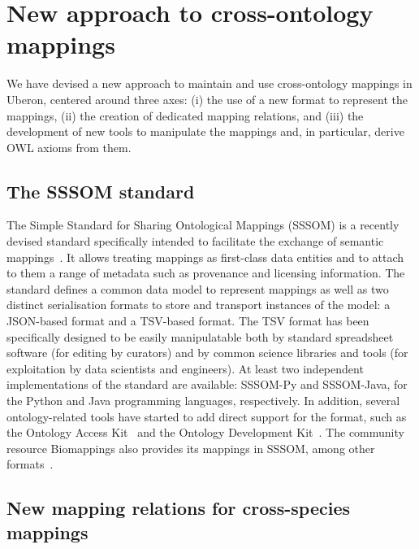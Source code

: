 \documentclass{ceurart}
\begin{document}
\section{New approach to cross-ontology mappings}

We have devised a new approach to maintain and use cross-ontology
mappings in Uberon, centered around three axes: (i) the use of a new
format to represent the mappings, (ii) the creation of dedicated mapping
relations, and (iii) the development of new tools to manipulate the
mappings and, in particular, derive OWL axioms from them.

\subsection{The SSSOM standard}

The Simple Standard for Sharing Ontological Mappings (SSSOM) is a recently
devised standard specifically intended to facilitate the exchange of semantic
mappings~\cite{matentzoglu2022b}. It allows treating mappings as first-class
data entities and to attach to them a range of metadata such as provenance and
licensing information. The standard defines a common data model to represent
mappings as well as two distinct serialisation formats to store and transport
instances of the model: a JSON-based format and a TSV-based format. The TSV
format has been specifically designed to be easily manipulatable both by
standard spreadsheet software (for editing by curators) and by common science
libraries and tools (for exploitation by data scientists and engineers). At
least two independent implementations of the standard are available: SSSOM-Py
and SSSOM-Java, for the Python and Java programming languages, respectively. In
addition, several ontology-related tools have started to add direct support for
the format, such as the Ontology Access Kit~\cite{mungall2023} and the Ontology
Development Kit~\cite{matentzoglu2022a}. The community resource Biomappings
also provides its mappings in SSSOM, among other formats~\cite{hoyt2023}.

\subsection{New mapping relations for cross-species mappings}
\end{document}
